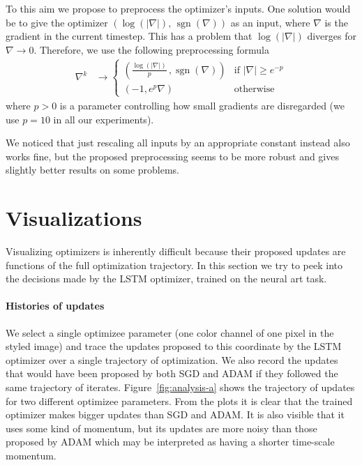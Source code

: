 \documentclass{article}
\begin{document}
To this aim we propose to preprocess the optimizer's inputs.
One solution would be to give the optimizer $\left(\log(|\nabla|),\,\operatorname{sgn}(\nabla)\right)$ as an input, where
$\nabla$ is the gradient in the current timestep.
This has a problem that $\log(|\nabla|)$ diverges for $\nabla \rightarrow 0$.
Therefore, we use the following preprocessing formula 
\begin{align*}
    \nabla^k &\rightarrow
\begin{cases}
    \left(\frac{\log(|\nabla|)}{p}\,, \operatorname{sgn}(\nabla)\right)& \text{if } |\nabla| \geq e^{-p}\\
    (-1, e^p \nabla)             & \text{otherwise}
\end{cases}
\end{align*}
where $p>0$ is a parameter controlling how small gradients are disregarded (we use $p=10$ in all our experiments).

We noticed that just rescaling all inputs by an appropriate constant instead also works fine, but
the proposed preprocessing seems to be more robust and gives slightly better results on some problems.

\section{Visualizations}
\label{sec:proposed-updates}

Visualizing optimizers is inherently difficult because their proposed updates
are functions of the full optimization trajectory.  In this section we try to
peek into the decisions made by the LSTM optimizer, trained on the neural art
task.

\paragraph{Histories of updates}

We select a single optimizee parameter (one color channel of one pixel in the
styled image) and trace the updates proposed to this coordinate by the LSTM
optimizer over a single trajectory of optimization.  We also record the updates
that would have been proposed by both SGD and ADAM if they followed the same
trajectory of iterates.  Figure~\ref{fig:analysis-a} shows the trajectory of
updates for two different optimizee parameters.  From the plots it is clear
that the trained optimizer makes bigger updates than SGD and ADAM.  It is also
visible that it uses some kind of momentum, but its updates are more noisy than
those proposed by ADAM which may be interpreted as having a shorter time-scale
momentum.
\end{document}
